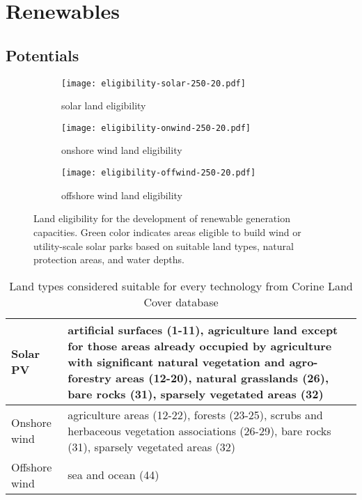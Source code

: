 
\section{Renewables}
\label{sec:si:renewables}

\subsection{Potentials}
\label{sec:si:renewable-potentials}


\begin{figure}
    \centering
    \begin{subfigure}[t]{0.48\textwidth}
            \centering
        \caption{solar land eligibility}
        \texttt{[image: eligibility-solar-250-20.pdf]}
    \end{subfigure}
    \begin{subfigure}[t]{0.48\textwidth}
        \centering
        \caption{onshore wind land eligibility}
        \texttt{[image: eligibility-onwind-250-20.pdf]}
    \end{subfigure}
    \begin{subfigure}[t]{0.48\textwidth}
        \centering
        \vspace{.5cm}
        \caption{offshore wind land eligibility}
        \texttt{[image: eligibility-offwind-250-20.pdf]}
    \end{subfigure}
    \caption{Land eligibility for the development of renewable generation capacities. Green color indicates
    areas eligible to build wind or utility-scale solar parks based on suitable land types, natural protection areas, and water depths.}
    \label{fig:eligibility}
\end{figure}


\begin{table}
    \caption{Land types considered suitable for every technology from Corine Land Cover database}
    \small
    \begin{tabularx}{\textwidth}{lX}
        \toprule
        Solar PV & artificial surfaces (1-11), agriculture land except for those
        areas already occupied by agriculture with significant natural
        vegetation and agro-forestry areas (12-20), natural grasslands (26), bare rocks (31),
        sparsely vegetated areas (32) \\ \midrule
        Onshore wind & agriculture areas (12-22), forests (23-25), scrubs and herbaceous vegetation associations (26-29), bare rocks (31), sparsely vegetated areas (32) \\ \midrule
        Offshore wind & sea and ocean (44) \\ \bottomrule
    \end{tabularx}
    \label{tab:eligibility}
\end{table}

